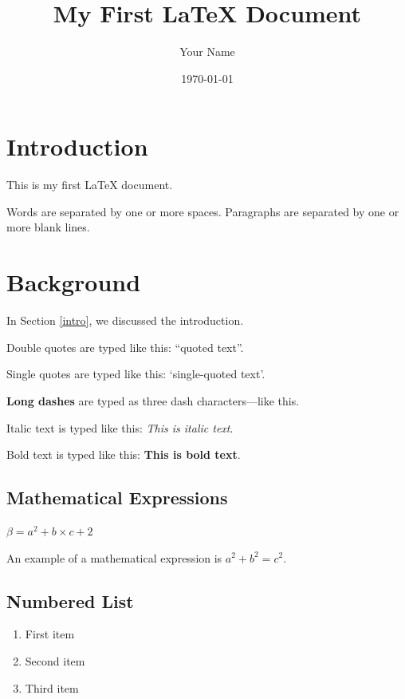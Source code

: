 \documentclass[12pt,a4paper]{article}
\begin{document}
	
	\title{My First LaTeX Document}
	\author{Your Name}
	\date{\today}
	
	\maketitle
	
	\tableofcontents
	
	\newpage
	
	\section{Introduction}
	
	This is my first LaTeX document.
	
	Words are separated by one or more spaces. Paragraphs are separated by one or more blank lines.
	
	\section{Background}
	
	In Section \ref{intro}, we discussed the introduction.
	
	Double quotes are typed like this: ``quoted text''.
	
	Single quotes are typed like this: `single-quoted text'.
	
	\textbf{Long dashes} are typed as three dash characters---like this.
	
	Italic text is typed like this: \textit{This is italic text}.
	
	Bold text is typed like this: \textbf{This is bold text}.
	
	\subsection{Mathematical Expressions}
	
	{\large $\beta = a^2 + b\times c + 2$}
	
	An example of a mathematical expression is $a^2+b^2=c^2$.
	
	\subsection{Numbered List}
	
	\begin{enumerate}
		\item First item
		\item Second item
		\item Third item
	\end{enumerate}
	
\end{document}
